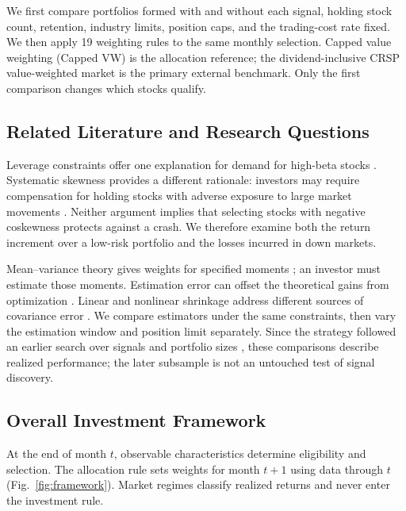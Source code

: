 \documentclass[letterpaper,journal]{IEEEtran}
\begin{document}
We first compare portfolios formed with and without each signal, holding stock count, retention, industry limits, position caps, and the trading-cost rate fixed. We then apply 19 weighting rules to the same monthly selection. Capped value weighting (Capped VW) is the allocation reference; the dividend-inclusive CRSP value-weighted market is the primary external benchmark. Only the first comparison changes which stocks qualify.

\subsection{Related Literature and Research Questions}
Leverage constraints offer one explanation for demand for high-beta stocks \cite{bab}. Systematic skewness provides a different rationale: investors may require compensation for holding stocks with adverse exposure to large market movements \cite{coskew}. Neither argument implies that selecting stocks with negative coskewness protects against a crash. We therefore examine both the return increment over a low-risk portfolio and the losses incurred in down markets.

Mean--variance theory gives weights for specified moments \cite{markowitz}; an investor must estimate those moments. Estimation error can offset the theoretical gains from optimization \cite{dgu}. Linear and nonlinear shrinkage address different sources of covariance error \cite{lw,qis}. We compare estimators under the same constraints, then vary the estimation window and position limit separately. Since the strategy followed an earlier search over signals and portfolio sizes \cite{overfit}, these comparisons describe realized performance; the later subsample is not an untouched test of signal discovery.

\subsection{Overall Investment Framework}
At the end of month $t$, observable characteristics determine eligibility and selection. The allocation rule sets weights for month $t+1$ using data through $t$ (Fig.~\ref{fig:framework}). Market regimes classify realized returns and never enter the investment rule.
\end{document}
